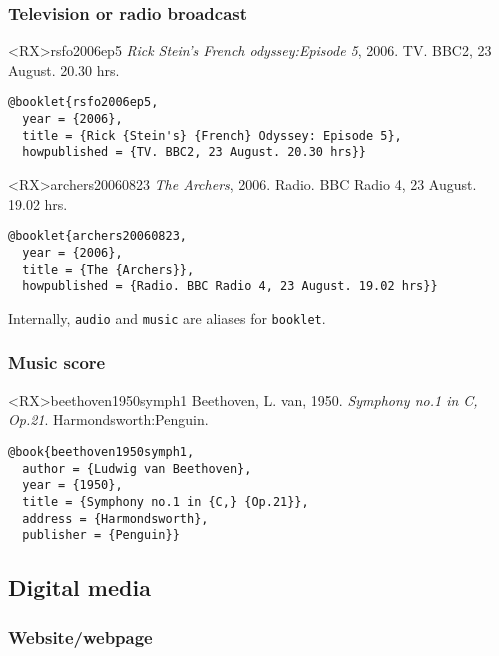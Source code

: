 \documentclass[10pt,a4paper]{article}
\newenvironment{info}{%
  \begin{list}{\makebox[2em][c]{\faInfoCircle}}{%
    \setlength{\leftmargin}{2em}
    \setlength{\labelwidth}{2em}
    \setlength{\labelsep}{0pt}}
}{\end{list}}
\begin{document}
\subsubsection*{Television or radio broadcast}

\begin{bibexbox}<RX>{rsfo2006ep5}
  \emph{Rick Stein's French odyssey:\@ Episode 5}, 2006. TV. BBC2, 23 August. 20.30 hrs.
  \tcblower
\begin{Verbatim}
@booklet{rsfo2006ep5,
  year = {2006},
  title = {Rick {Stein's} {French} Odyssey: Episode 5},
  howpublished = {TV. BBC2, 23 August. 20.30 hrs}}
\end{Verbatim}
\end{bibexbox}

\begin{bibexbox}<RX>{archers20060823}
  \emph{The Archers}, 2006. Radio. BBC Radio 4, 23 August. 19.02 hrs.
  \tcblower
\begin{Verbatim}
@booklet{archers20060823,
  year = {2006},
  title = {The {Archers}},
  howpublished = {Radio. BBC Radio 4, 23 August. 19.02 hrs}}
\end{Verbatim}
\end{bibexbox}


\begin{info}\item Internally, \texttt{audio} and \texttt{music} are aliases for \texttt{booklet}.\end{info}

\subsubsection*{Music score}

\begin{bibexbox}<RX>{beethoven1950symph1}
  Beethoven, L. van, 1950. \emph{Symphony no.1 in C, Op.21}. Harmondsworth:\@ Penguin.
  \tcblower
\begin{Verbatim}
@book{beethoven1950symph1,
  author = {Ludwig van Beethoven},
  year = {1950},
  title = {Symphony no.1 in {C,} {Op.21}},
  address = {Harmondsworth},
  publisher = {Penguin}}
\end{Verbatim}
\end{bibexbox}

\subsection{Digital media}

\subsubsection*{Website\slash webpage}
\end{document}
